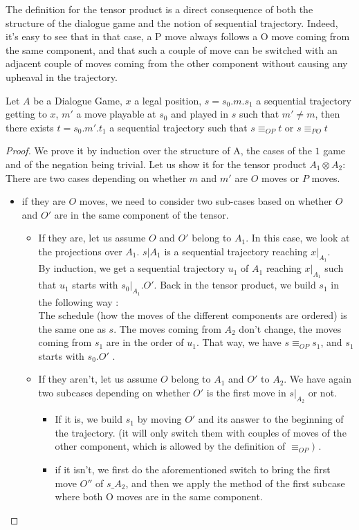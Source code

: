 \documentclass[a4paper,UKenglish]{lipics}
\begin{document}
The definition for the tensor product is a direct consequence of both the structure of the dialogue game and the notion of sequential trajectory. Indeed, it's easy to see that in that case, a P move always follows a O move coming from the same component, and that such a couple of move can be switched with an adjacent couple of moves coming from the other component without causing any upheaval in the trajectory. \\
 \begin{lemma}
Let $A$ be a Dialogue Game, $x$ a legal position, $s=s_0.m.s_1$ a sequential trajectory getting to $x$, $m'$ a move playable at $s_0$ and played in $s$ such that  $m'\neq m$, then there exists $t=s_0.m'.t_1$ a sequential trajectory such that $s\equiv_{OP} t$ or $s\equiv_{PO} t$
\end{lemma}
\begin{proof}
We prove it by induction over the structure of A, the cases of the $1$ game and of the negation being trivial. Let us show it for the tensor product $A_1 \otimes A_2$:\\
There are two cases depending on whether $m$ and $m'$ are $O$ moves or $P$ moves.
\begin{itemize}
\item if they are $O$ moves, we need to consider two sub-cases based on whether $O$ and $O'$ are in the same component of the tensor. 

\begin{itemize}
\item If they are, let us assume $O$ and $O'$ belong to $A_1$.  In this case, we look at the projections over $A_1$. $s|A_1$ is a sequential trajectory reaching $x|_{A_1}$.\\ By induction, we get a sequential trajectory $u_1$ of $A_1$ reaching $x|_{A_1}$ such that $u_1$ starts with $s_0|_{A_1}.O'$. Back in the tensor product, we build $s_1$ in the following way :\\ 
The schedule (how the moves of the different components are ordered) is the same one as $s$. The moves coming from $A_2$ don't change, the moves coming from $s_1$ are in the order of $u_1$. That way, we have $s \equiv_{OP} s_1$, and $s_1$ starts with $s_0.O'$ .\\

\item If they aren't, let us assume $O$ belong to $A_1$ and $O'$ to $A_2$. We have again two subcases depending on whether $O'$ is the first move in $s|_{A_2}$  or not.
\begin{itemize}
\item If it is, we build $s_1$ by moving $O'$ and its answer to the beginning of the trajectory. (it will only switch them with couples of moves of the other component, which is allowed by the definition of $\equiv_{OP})$ .
\item if it isn't, we first do the aforementioned switch to bring the first move  $O''$  of $s\_{A_2}$, and then we apply the method of the first subcase where both O moves are in the same component.
\end{itemize}


\end{itemize}
\end{itemize}
\end{proof}
\end{document}
